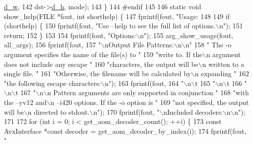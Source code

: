 \begin{DoxyCodeInclude}
      \hyperlink{structaom__image_a89f80b1f58d608b9d2080635f4359034}{d\_w},
142                    dst->\hyperlink{structaom__image_ab986419a1f0fff93a2dc505f47194988}{d\_h}, mode);
143 \}
144 \textcolor{preprocessor}{#endif}
145 
146 \textcolor{keyword}{static} \textcolor{keywordtype}{void} show\_help(FILE *fout, \textcolor{keywordtype}{int} shorthelp) \{
147   fprintf(fout, \textcolor{stringliteral}{"Usage: %
148 
149   \textcolor{keywordflow}{if} (shorthelp) \{
150     fprintf(fout, \textcolor{stringliteral}{"Use --help to see the full list of options.\(\backslash\)n"});
151     \textcolor{keywordflow}{return};
152   \}
153 
154   fprintf(fout, \textcolor{stringliteral}{"Options:\(\backslash\)n"});
155   arg\_show\_usage(fout, all\_args);
156   fprintf(fout,
157           \textcolor{stringliteral}{"\(\backslash\)nOutput File Patterns:\(\backslash\)n\(\backslash\)n"}
158           \textcolor{stringliteral}{"  The -o argument specifies the name of the file(s) to "}
159           \textcolor{stringliteral}{"write to. If the\(\backslash\)n  argument does not include any escape "}
160           \textcolor{stringliteral}{"characters, the output will be\(\backslash\)n  written to a single file. "}
161           \textcolor{stringliteral}{"Otherwise, the filename will be calculated by\(\backslash\)n  expanding "}
162           \textcolor{stringliteral}{"the following escape characters:\(\backslash\)n"});
163   fprintf(fout,
164           \textcolor{stringliteral}{"\(\backslash\)n\(\backslash\)t%
165           \textcolor{stringliteral}{"\(\backslash\)n\(\backslash\)t%
166           \textcolor{stringliteral}{"\(\backslash\)n\(\backslash\)t%
167           \textcolor{stringliteral}{"\(\backslash\)n\(\backslash\)n  Pattern arguments are only supported in conjunction "}
168           \textcolor{stringliteral}{"with the --yv12 and\(\backslash\)n  --i420 options. If the -o option is "}
169           \textcolor{stringliteral}{"not specified, the output will be\(\backslash\)n  directed to stdout.\(\backslash\)n"});
170   fprintf(fout, \textcolor{stringliteral}{"\(\backslash\)nIncluded decoders:\(\backslash\)n\(\backslash\)n"});
171 
172   \textcolor{keywordflow}{for} (\textcolor{keywordtype}{int} i = 0; i < get\_aom\_decoder\_count(); ++i) \{
173     \textcolor{keyword}{const} AvxInterface *\textcolor{keyword}{const} decoder = get\_aom\_decoder\_by\_index(i);
174     fprintf(fout, \textcolor{stringliteral}{"    %
}}}}}
\end{DoxyCodeInclude}
